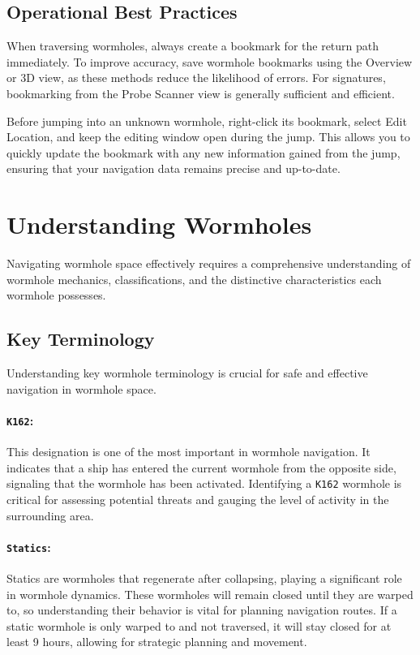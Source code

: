 \documentclass[a4paper,12pt]{article}
\begin{document}
\subsection{Operational Best Practices}

When traversing wormholes, always create a bookmark for the return path immediately. To improve accuracy, save wormhole bookmarks using the Overview or 3D view, as these methods reduce the likelihood of errors. For signatures, bookmarking from the Probe Scanner view is generally sufficient and efficient.

Before jumping into an unknown wormhole, right-click its bookmark, select Edit Location, and keep the editing window open during the jump. This allows you to quickly update the bookmark with any new information gained from the jump, ensuring that your navigation data remains precise and up-to-date.

\section{Understanding Wormholes}

Navigating wormhole space effectively requires a comprehensive understanding of wormhole mechanics, classifications, and the distinctive characteristics each wormhole possesses.

\subsection{Key Terminology}

Understanding key wormhole terminology is crucial for safe and effective navigation in wormhole space.

\paragraph{\texttt{K162}:} This designation is one of the most important in wormhole navigation. It indicates that a ship has entered the current wormhole from the opposite side, signaling that the wormhole has been activated. Identifying a \texttt{K162} wormhole is critical for assessing potential threats and gauging the level of activity in the surrounding area.

\paragraph{\texttt{Statics}:} Statics are wormholes that regenerate after collapsing, playing a significant role in wormhole dynamics. These wormholes will remain closed until they are warped to, so understanding their behavior is vital for planning navigation routes. If a static wormhole is only warped to and not traversed, it will stay closed for at least 9 hours, allowing for strategic planning and movement.
\end{document}
